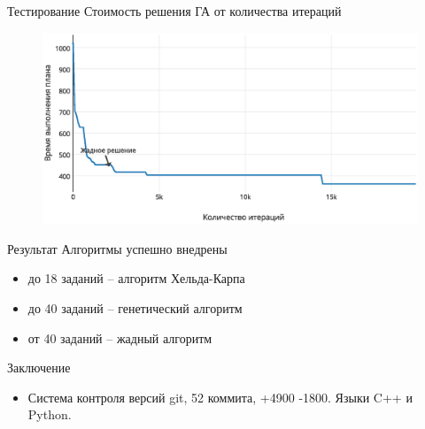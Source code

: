 \documentclass{beamer}
\begin{document}
\begin{frame}{Тестирование}
Стоимость решения ГА от количества итераций
\begin{figure}[here]
    \includegraphics[scale=0.5]{images/iter-value-20-plot.eps}
\end{figure}

\end{frame}

\begin{frame}{Результат}
Алгоритмы успешно внедрены
\begin{itemize}
\item до 18 заданий -- алгоритм Хельда-Карпа
\item до 40 заданий -- генетический алгоритм
\item от 40 заданий -- жадный алгоритм
\end{itemize}
\end{frame}

\begin{frame}{Заключение}
\begin{itemize}
\item Система контроля версий git, 52 коммита, +4900 -1800. Языки C++ и Python.
\end{itemize}

\end{frame}
\end{document}
